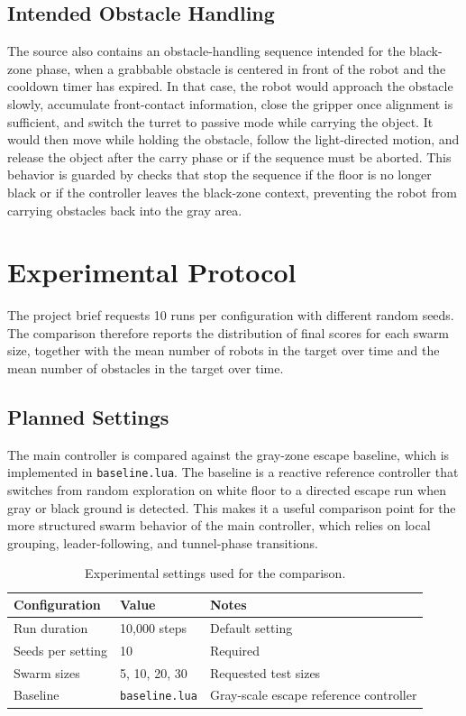 \documentclass[runningheads]{llncs}
\begin{document}
\subsection{Intended Obstacle Handling}
The source also contains an obstacle-handling sequence intended for the
black-zone phase, when a grabbable obstacle is centered in front of the robot
and the cooldown timer has expired. In that case, the robot would approach the
obstacle slowly, accumulate front-contact information, close the gripper once
alignment is sufficient, and switch the turret to passive mode while carrying
the object. It would then move while holding the obstacle, follow the
light-directed motion, and release the object after the carry phase or if the
sequence must be aborted. This behavior is guarded by checks that stop the
sequence if the floor is no longer black or if the controller leaves the
black-zone context, preventing the robot from carrying obstacles back into the
gray area.

\section{Experimental Protocol}
The project brief requests 10 runs per configuration with different random
seeds. The comparison therefore reports the distribution of final scores for
each swarm size, together with the mean number of robots in the target over
time and the mean number of obstacles in the target over time.

\subsection{Planned Settings}
The main controller is compared against the gray-zone escape baseline, which is
implemented in \texttt{baseline.lua}. The baseline is a reactive reference
controller that switches from random exploration on white floor to a directed
escape run when gray or black ground is detected. This makes it a useful
comparison point for the more structured swarm behavior of the main controller,
which relies on local grouping, leader-following, and tunnel-phase transitions.

\begin{table}[htbp]
\centering
\caption{Experimental settings used for the comparison.}
\label{tab:settings}
\begin{tabular}{|l|l|l|}
\hline
Configuration & Value & Notes \\
\hline
Run duration & 10{,}000 steps & Default setting \\
\hline
Seeds per setting & 10 & Required \\
\hline
Swarm sizes & 5, 10, 20, 30 & Requested test sizes \\
\hline
Baseline & \texttt{baseline.lua} & Gray-scale escape reference controller \\
\hline
\end{tabular}
\end{table}
\end{document}
